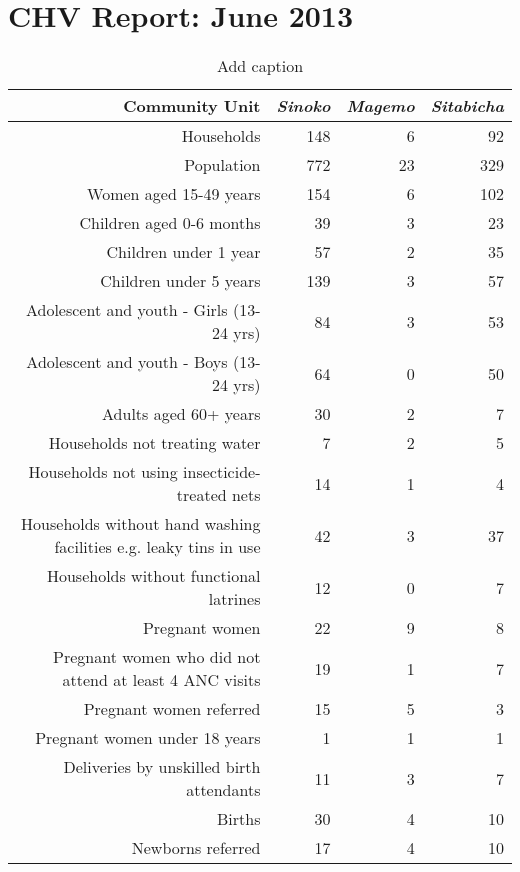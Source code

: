 \chapter{CHV Report: June 2013}

\begin{adjustbox}{width=\textwidth, totalheight=\textheight,keepaspectratio}
\begin{table}[htbp]
  \caption{Add caption}
    \begin{tabular}{rrrr}
    \toprule
    \textbf{Community Unit} & \textit{Sinoko} & \textit{Magemo} & \textit{Sitabicha} \\
    \midrule
    Households & 148   & 6     & 92 \\
    Population & 772   & 23    & 329 \\
    Women aged 15-49 years & 154   & 6     & 102 \\
    Children aged 0-6 months & 39    & 3     & 23 \\
    Children under 1 year & 57    & 2     & 35 \\
    Children under 5 years & 139   & 3     & 57 \\
    Adolescent and youth - Girls (13-24 yrs) & 84    & 3     & 53 \\
    Adolescent and youth - Boys (13-24 yrs) & 64    & 0     & 50 \\
    Adults aged 60+ years & 30    & 2     & 7 \\
    Households not treating water & 7     & 2     & 5 \\
    Households not using insecticide-treated nets & 14    & 1     & 4 \\
    Households without hand washing facilities e.g. leaky tins in use & 42    & 3     & 37 \\
    Households without functional latrines & 12    & 0     & 7 \\
    Pregnant women & 22    & 9     & 8 \\
    Pregnant women who did not attend at least 4 ANC visits & 19    & 1     & 7 \\
    Pregnant women referred & 15    & 5     & 3 \\
    Pregnant women under 18 years & 1     & 1     & 1 \\
    Deliveries by unskilled birth attendants & 11    & 3     & 7 \\
    Births & 30    & 4     & 10 \\
    Newborns referred & 17    & 4     & 10 \\

\end{tabular}
\end{table}
\end{adjustbox}
